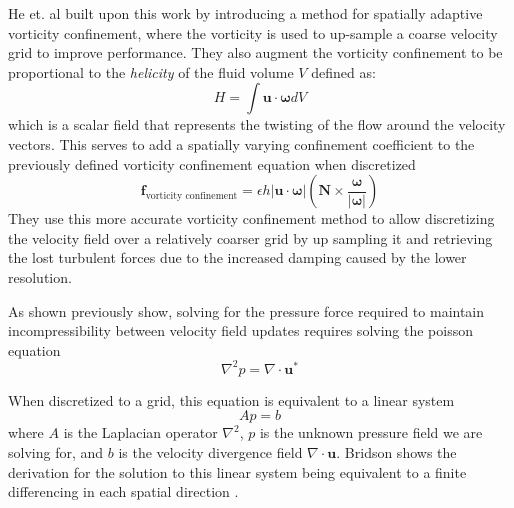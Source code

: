 \documentclass[a4paper, 11pt, titlepage]{article}
\renewcommand\i[1]{\textit{#1}}%
\begin{document}
He et. al built upon this work by introducing a method for spatially adaptive
vorticity confinement, where the vorticity is used to up-sample a coarse
velocity grid to improve performance. They also augment the vorticity
confinement to be proportional to the \i{helicity} of the fluid volume $V$ defined as:
$$
    H = \int \bm{u} \cdot \bm{\omega} dV
$$
which is a scalar field that represents the twisting of the flow around the
velocity vectors. This serves to add a spatially varying confinement coefficient
to the previously defined vorticity confinement equation when discretized
\begin{equation}
    \bm{f}_\text{vorticity confinement} = \epsilon h \vert \bm{u} \cdot \bm{\omega} \vert\left(\bm{N} \times \frac{\bm{\omega}}{\vert \bm{\omega} \vert}\right)
\end{equation}
They use this more accurate vorticity confinement method to allow discretizing
the velocity field over a relatively coarser grid by up sampling it and
retrieving the lost turbulent forces due to the increased damping caused by the
lower resolution.

As shown previously show, solving for the pressure force required to maintain
incompressibility between velocity field updates requires solving the poisson
equation
$$
\nabla^2p = \nabla \cdot \bm{u}^*
$$

When discretized to a grid, this equation is equivalent to a linear system
$$
    Ap = b
$$
where $A$ is the Laplacian operator $\nabla^2$, $p$ is the unknown pressure
field we are solving for, and $b$ is the velocity divergence field $\nabla \cdot
\bm{u}$. Bridson shows the derivation for the solution to this linear system
being equivalent to a finite differencing in each spatial
direction \cite{bridsonbook}.
\end{document}
